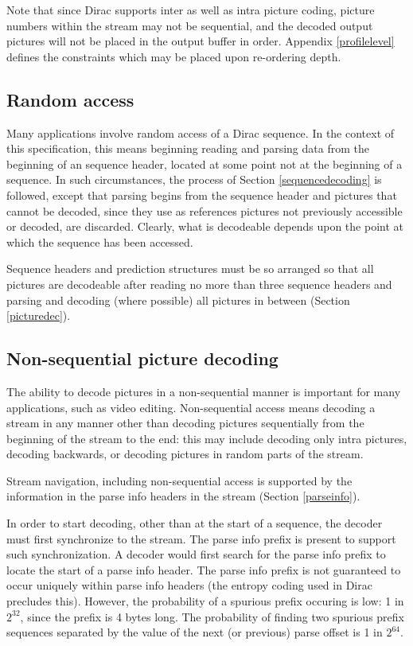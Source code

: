 Note that since Dirac supports inter as well as intra picture coding, picture numbers
within the stream may not be sequential, and the decoded output pictures will not be
placed in the output buffer in order. Appendix \ref{profilelevel} defines the constraints
which may be placed upon re-ordering depth.

\subsection{Random access}
\label{randomaccess}

Many applications involve random access of a Dirac sequence. In the context
 of this specification, this means beginning reading and parsing data from the 
beginning of an sequence header, located at some point not at the beginning
 of a sequence. In such circumstances, the process of Section 
\ref{sequencedecoding} is followed, except that parsing begins from the sequence header
 and pictures that cannot be decoded, since they use as references pictures not
 previously accessible or decoded, are discarded. Clearly, what is decodeable depends
 upon the point at which the sequence has been accessed.

Sequence headers and prediction structures must be so arranged so that all pictures
are decodeable after reading no more than three sequence headers and parsing and decoding (where possible) all pictures in between (Section \ref{picturedec}).

\subsection{Non-sequential picture decoding}

The ability to decode pictures in a non-sequential manner is important for many
 applications, such as video editing. Non-sequential access means decoding a 
stream in any manner other than decoding pictures sequentially from the beginning 
of the stream to the end: this may include decoding only intra pictures, decoding backwards, or decoding pictures in random parts of the stream. 

Stream navigation, including non-sequential access is supported by the information 
in the parse info headers in the stream (Section \ref{parseinfo}). 

In order to start decoding, other than at the start of a sequence, the decoder 
must first synchronize to the stream. The parse info prefix is present to support such synchronization. A decoder would first search for the parse info prefix to locate 
the start of a parse info header. The parse info prefix is not guaranteed to occur
 uniquely within parse info headers (the entropy coding used in 
Dirac precludes this). However, the probability of a spurious 
prefix occuring is low: 1 in $2^{32}$, since the prefix is 4 bytes long. The probability of finding 
two spurious prefix sequences separated by the value of the next (or previous) parse 
offset is 1 in $2^{64}$.  

